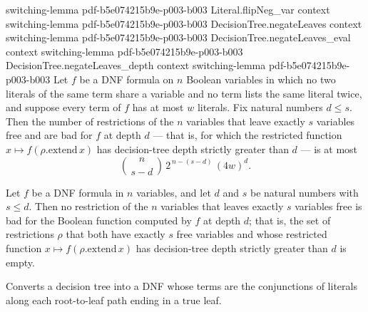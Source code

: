 \begin{lemma}
  {switching-lemma}
  {pdf-b5e074215b9e-p003-b003}
\proofstep
  {Literal.flipNeg_var}
  {context}
  {switching-lemma}
  {pdf-b5e074215b9e-p003-b003}
\proofstep
  {DecisionTree.negateLeaves}
  {context}
  {switching-lemma}
  {pdf-b5e074215b9e-p003-b003}
\proofstep
  {DecisionTree.negateLeaves_eval}
  {context}
  {switching-lemma}
  {pdf-b5e074215b9e-p003-b003}
\proofstep
  {DecisionTree.negateLeaves_depth}
  {context}
  {switching-lemma}
  {pdf-b5e074215b9e-p003-b003}
Let $f$ be a DNF formula on $n$ Boolean variables in which no two literals of the same
term share a variable and no term lists the same literal twice, and suppose every term
of $f$ has at most $w$ literals. Fix natural numbers $d \le s$. Then the number of
restrictions of the $n$ variables that leave exactly $s$ variables free and are bad for
$f$ at depth $d$ — that is, for which the restricted function $x \mapsto
f(\rho.\mathrm{extend}\,x)$ has decision-tree depth strictly greater than $d$ — is at
most
\[
\binom{n}{\,s-d\,}\, 2^{\,n-(s-d)}\, (4w)^{d}.
\]
\end{lemma}

\begin{lemma}
\label{SwitchingLemma.bad_filter_empty_of_d_ge_s}
\leanok
{}
Let $f$ be a DNF formula in $n$ variables, and let $d$ and $s$ be natural numbers with
$s \le d$. Then no restriction of the $n$ variables that leaves exactly $s$ variables
free is bad for the Boolean function computed by $f$ at depth $d$; that is, the set of
restrictions $\rho$ that both have exactly $s$ free variables and whose restricted
function $x \mapsto f(\rho.\mathrm{extend}\,x)$ has decision-tree depth strictly greater
than $d$ is empty.
\end{lemma}

\begin{definition}
\label{SwitchingLemma.toDNF}
\leanok
{}
Converts a decision tree into a DNF whose terms are the conjunctions of literals
along each root-to-leaf path ending in a $\mathrm{true}$ leaf.
\end{definition}

